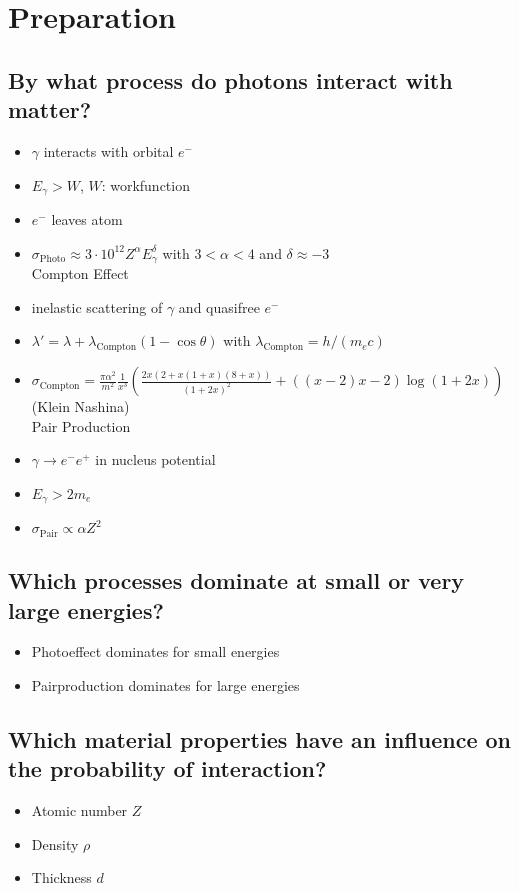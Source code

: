 \section{Preparation}
\subsection*{By what process do photons interact with matter?}
\begin{itemize}
    Photoelectric Effect
    \item $\gamma$ interacts with orbital $e^-$
    \item $E_\gamma > W$, $W$: workfunction
    \item $e^-$ leaves atom
    \item $\sigma_\text{Photo}\approx 3\cdot 10^{12} Z^\alpha E_\gamma^\delta$ 
    with $3<\alpha<4$ and $\delta\approx -3$
    \\
    Compton Effect
    \item inelastic scattering of $\gamma$ and quasifree $e^-$
    \item $\lambda'=\lambda+\lambda_\text{Compton}(1-\cos{\theta})$
    with $\lambda_\text{Compton}=h/(m_ec)$
    \item $\sigma_\text{Compton}=\frac{\pi\alpha^2}{m^2}\frac{1}{x^3}\left(\frac{2x(2+x(1+x)(8+x))}{(1+2x)^2}+((x-2)x-2)\log(1+2x)\right)$
    (Klein Nashina)
    \\
    Pair Production
    \item $\gamma\to e^-e^+$ in nucleus potential
    \item $E_\gamma > 2m_e$
    \item $\sigma_\text{Pair}\propto \alpha Z^2$
\end{itemize}
\subsection*{Which processes dominate at small or very large energies?}
\begin{itemize}
    \item Photoeffect dominates for small energies
    \item Pairproduction dominates for large energies
\end{itemize}
\subsection*{Which material properties have an influence on the 
probability of interaction?}
\begin{itemize}
    \item Atomic number $Z$
    \item Density $\rho$
    \item Thickness $d$
\end{itemize}
